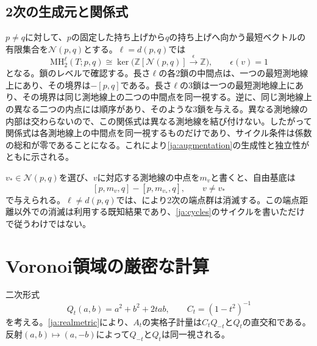 \documentclass[12pt]{amsart}
\theoremstyle{definition}
\theoremstyle{remark}
\numberwithin{equation}{section}
\newcommand{\Z}{\mathbb{Z}}
\newcommand{\MH}{\mathrm{MH}}
\begin{document}
\subsection{2次の生成元と関係式}
$p\ne q$に対して、$p$の固定した持ち上げから$q$の持ち上げへ向かう最短ベクトルの有限集合を$\mathcal N(p,q)$とする。$\ell=d(p,q)$では
\begin{equation}\label{ja:augmentation}
\MH_2^\ell(T;p,q)\cong
\ker\bigl(\Z[\mathcal N(p,q)]\xrightarrow{\epsilon}\Z\bigr),
\qquad \epsilon(v)=1
\end{equation}
となる。鎖のレベルで確認する。長さ$\ell$の各2鎖の中間点は、一つの最短測地線上にあり、その境界は$-[p,q]$である。長さ$\ell$の3鎖は一つの最短測地線上にあり、その境界は同じ測地線上の二つの中間点を同一視する。逆に、同じ測地線上の異なる二つの内点には順序があり、そのような3鎖を与える。異なる測地線の内部は交わらないので、この関係式は異なる測地線を結び付けない。したがって関係式は各測地線上の中間点を同一視するものだけであり、サイクル条件は係数の総和が零であることになる。これにより\eqref{ja:augmentation}の生成性と独立性がともに示される。

$v_*\in\mathcal N(p,q)$を選び、$v$に対応する測地線の中点を$m_v$と書くと、自由基底は
\begin{equation}\label{ja:cycles}
[p,m_v,q]-[p,m_{v_*},q],\qquad v\ne v_*
\end{equation}
で与えられる。$\ell\ne d(p,q)$では、\cite[Corollary 3.15]{ja:G}により2次の端点群は消滅する。この端点距離以外での消滅は利用する既知結果であり、\eqref{ja:cycles}のサイクルを書いただけで従うわけではない。

\section{Voronoi領域の厳密な計算}
二次形式
\begin{equation}\label{ja:quad}
Q_t(a,b)=a^2+b^2+2tab,
\qquad C_t=(1-t^2)^{-1}
\end{equation}
を考える。\eqref{ja:realmetric}により、$A_t$の実格子計量は$C_tQ_{-t}$と$Q_t$の直交和である。反射$(a,b)\mapsto(a,-b)$によって$Q_{-t}$と$Q_t$は同一視される。
\end{document}
